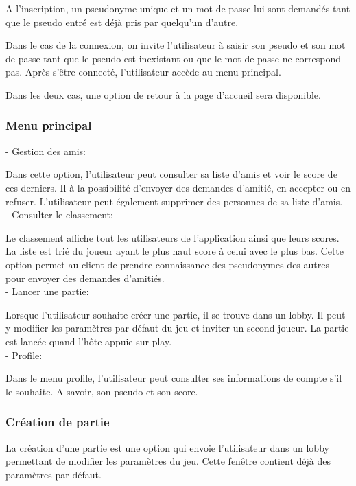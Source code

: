\documentclass[a4paper,12pt]{article}
\begin{document}
A l'inscription, un pseudonyme unique et un mot de passe lui sont demandés tant que le pseudo entré est déjà pris par quelqu'un d'autre.

Dans le cas de la connexion, on invite l'utilisateur à saisir son pseudo et son mot de passe tant que le pseudo est inexistant ou que le mot de passe ne correspond pas. Après s’être connecté, l'utilisateur accède au menu principal.

Dans les deux cas, une option de retour à la page d'accueil sera disponible.

\subsubsection{Menu principal}

- Gestion des amis:

Dans cette option, l'utilisateur peut consulter sa liste d'amis et voir le score de ces derniers. Il à la possibilité d'envoyer 
des demandes d'amitié, en accepter ou en refuser. L'utilisateur peut également supprimer des personnes de sa liste d'amis.\\

- Consulter le classement:

Le classement affiche tout les utilisateurs de l'application ainsi que leurs scores. La liste est trié du joueur ayant le plus haut score à celui avec le plus bas.  
Cette option permet au client de prendre connaissance des pseudonymes des autres pour envoyer des demandes d'amitiés.\\

- Lancer une partie:

Lorsque l'utilisateur souhaite créer une partie, il se trouve dans un lobby. Il peut y modifier les paramètres par défaut du jeu et inviter un second joueur.
La partie est lancée quand l'hôte appuie sur play.\\

- Profile:

Dans le menu profile, l'utilisateur peut consulter ses informations de compte s'il le souhaite. A savoir, son pseudo et son score.

\subsubsection{Création de partie}
La création d'une partie est une option qui envoie l'utilisateur dans un lobby permettant de modifier les paramètres du jeu.
Cette fenêtre contient déjà des paramètres par défaut.
\end{document}
